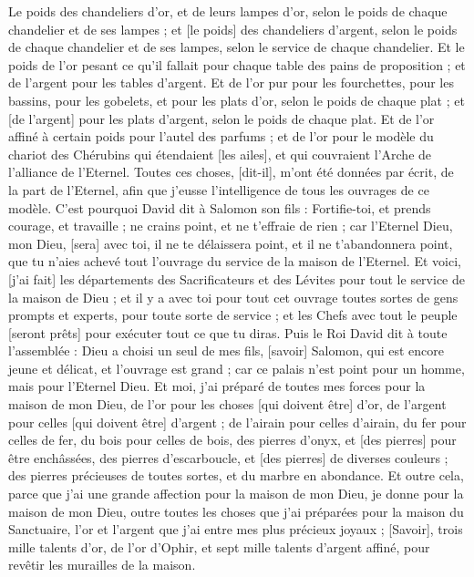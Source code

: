 \begin{multicols}{2}
Le poids des chandeliers d'or, et de leurs lampes d'or, selon le poids de chaque chandelier et de ses lampes ; et [le poids] des chandeliers d'argent, selon le poids de chaque chandelier et de ses lampes, selon le service de chaque chandelier.
Et le poids de l'or pesant ce qu'il fallait pour chaque table des pains de proposition ; et de l'argent pour les tables d'argent.
Et de l'or pur pour les fourchettes, pour les bassins, pour les gobelets, et pour les plats d'or, selon le poids de chaque plat ; et [de l'argent] pour les plats d'argent, selon le poids de chaque plat.
Et de l'or affiné à certain poids pour l'autel des parfums ; et de l'or pour le modèle du chariot des Chérubins qui étendaient [les ailes], et qui couvraient l'Arche de l'alliance de l'Eternel.
Toutes ces choses, [dit-il], m'ont été données par écrit, de la part de l'Eternel, afin que j'eusse l'intelligence de tous les ouvrages de ce modèle.
C'est pourquoi David dit à Salomon son fils : Fortifie-toi, et prends courage, et travaille ; ne crains point, et ne t'effraie de rien ; car l'Eternel Dieu, mon Dieu, [sera] avec toi, il ne te délaissera point, et il ne t'abandonnera point, que tu n'aies achevé tout l'ouvrage du service de la maison de l'Eternel.
Et voici, [j'ai fait] les départements des Sacrificateurs et des Lévites pour tout le service de la maison de Dieu ; et il y a avec toi pour tout cet ouvrage toutes sortes de gens prompts et experts, pour toute sorte de service ; et les Chefs avec tout le peuple [seront prêts] pour exécuter tout ce que tu diras.
\VerseOne{}Puis le Roi David dit à toute l'assemblée : Dieu a choisi un seul de mes fils, [savoir] Salomon, qui est encore jeune et délicat, et l'ouvrage est grand ; car ce palais n'est point pour un homme, mais pour l'Eternel Dieu.
Et moi, j'ai préparé de toutes mes forces pour la maison de mon Dieu, de l'or pour les choses [qui doivent être] d'or, de l'argent pour celles [qui doivent être] d'argent ; de l'airain pour celles d'airain, du fer pour celles de fer, du bois pour celles de bois, des pierres d'onyx, et [des pierres] pour être enchâssées, des pierres d'escarboucle, et [des pierres] de diverses couleurs ; des pierres précieuses de toutes sortes, et du marbre en abondance.
Et outre cela, parce que j'ai une grande affection pour la maison de mon Dieu, je donne pour la maison de mon Dieu, outre toutes les choses que j'ai préparées pour la maison du Sanctuaire, l'or et l'argent que j'ai entre mes plus précieux joyaux ;
[Savoir], trois mille talents d'or, de l'or d'Ophir, et sept mille talents d'argent affiné, pour revêtir les murailles de la maison.

\end{multicols}
